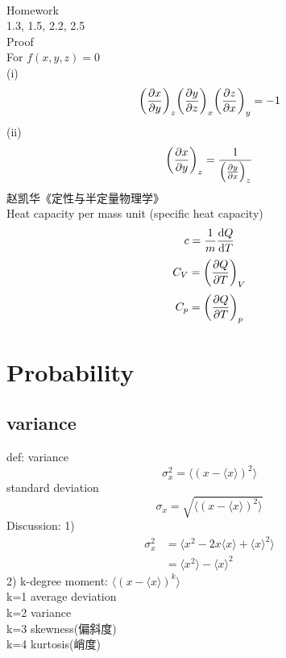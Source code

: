 \documentclass[UTF8]{ctexart} %
\numberwithin{equation}{subsection}
\begin{document}
~\\
Homework\\
1.3, 1.5, 2.2, 2.5\\
Proof\\
For $f(x,y,z)=0$\\
(i)
\begin{equation}\label{key}
\qty(\pdv{x}{y})_z\qty(\pdv{y}{z})_x\qty(\pdv{z}{x})_y=-1
\end{equation}
(ii)
\begin{equation}\label{key}
\qty(\pdv{x}{y})_z=\dfrac{1}{\qty(\pdv{y}{x})_z}
\end{equation}
赵凯华《定性与半定量物理学》\\
Heat capacity per mass unit (specific heat capacity)
\begin{equation}\label{key}
c=\dfrac{1}{m}\dv{Q}{T}
\end{equation}
\begin{equation}\label{key}
C_V=\qty(\pdv{Q}{T})_V
\end{equation}
\begin{equation}\label{key}
C_p=\qty(\pdv{Q}{T})_p
\end{equation}
\section{Probability}
\setcounter{subsection}{3}
\subsection{variance}
def: variance
\begin{equation}\label{key}
\sigma_x^2=\langle(x-\langle x\rangle)^2\rangle
\end{equation}
standard deviation
\begin{equation}\label{key}
\sigma_x=\sqrt{\langle(x-\langle x\rangle)^2\rangle}
\end{equation}
Discussion:
1) 
\begin{equation}\label{key}
\begin{aligned}
\sigma_x^2&=\langle x^2-2x\langle x\rangle+\langle x\rangle^2\rangle\\
&=\langle x^2\rangle-\langle x\rangle^2
\end{aligned}
\end{equation}
2) k-degree moment: $\langle(x-\langle x\rangle)^k\rangle$\\
k=1		average deviation\\
k=2		variance\\
k=3		skewness(偏斜度)\\
k=4		kurtosis(峭度)\\
\end{document}
